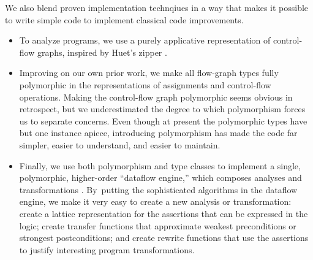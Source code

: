 \documentclass[blockstyle,preprint,nocopyrightspace]{sigplanconf}
\let\cite\citep
\newcommand{\authornote}[1]{{\em #1}}
\def\authornote#1{\unskip\relax}
\newcommand{\simon}[1]{\authornote{SLPJ: #1}}
\newcommand\secref[1]{Section~\ref{sec:#1}}
\begin{document}
We also blend proven implementation technqiues
in a way that
makes it possible to
write simple code
to implement classical code improvements.
\begin{itemize}
\item
To {analyze} programs, we use a purely applicative representation of
control-flow graphs, inspired by Huet's zipper
\cite{huet:zipper,ramsey-dias:applicative-flow-graph}. 
%
%
\item
Improving on our own prior work, we make all flow-graph
types fully polymorphic in the representations of
assignments and control-flow operations.
%
Making the control-flow graph polymorphic seems obvious in retrospect,
but we underestimated the degree to which polymorphism forces us to
separate concerns.
Even though at present the polymorphic types have but one instance
apiece, introducing polymorphism has made the code far simpler, easier
to understand, and easier to maintain. \simon{Is it possible to substantiate
this claim by examples?}
%
%
\item
Finally, we use both polymorphism and type classes to implement a single,
polymorphic,
higher-order ``dataflow engine,'' which composes analyses and transformations
\cite{lerner-grove-chambers:2002}. 
By~putting the sophisticated algorithms in the dataflow engine, 
we make it very easy to create a new analysis or transformation:
create a lattice representation for the assertions that can be
expressed in the logic;
create transfer functions that approximate weakest preconditions or
strongest postconditions;
and 
create rewrite functions that use the assertions to justify
interesting program transformations.  \simon{Isn't this
re-usability what Chambers was on about in his original paper?
In what way is it easier for us to create new analyses than it is for him?}
\end{itemize}
\end{document}
